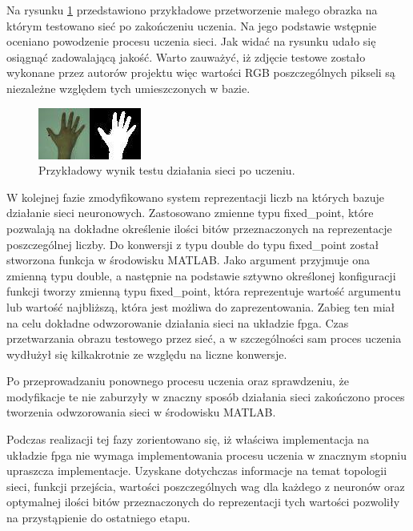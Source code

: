 Na rysunku \ref{fig:reka} przedstawiono przykładowe przetworzenie małego obrazka na którym testowano sieć po zakończeniu uczenia. Na jego podstawie wstępnie oceniano powodzenie procesu uczenia sieci. Jak widać na rysunku udało się osiągnąć zadowalającą jakość. Warto zauważyć, iż zdjęcie testowe zostało wykonane przez autorów projektu więc wartości RGB poszczególnych pikseli są niezależne względem tych umieszczonych w bazie.

\begin{figure}[tbph!]
	\centering
	\includegraphics[width=0.6\linewidth]{images/reka.png}
	\caption{Przykładowy wynik testu działania sieci po uczeniu.}
	\label{fig:reka}
\end{figure}

W kolejnej fazie zmodyfikowano system reprezentacji liczb na których bazuje działanie sieci neuronowych. Zastosowano zmienne typu fixed\_point, które pozwalają na dokładne określenie ilości bitów przeznaczonych na reprezentacje poszczególnej liczby. Do konwersji z typu double do typu fixed\_point został stworzona funkcja w środowisku MATLAB. Jako argument przyjmuje ona zmienną typu double, a następnie na podstawie sztywno określonej konfiguracji funkcji tworzy zmienną typu fixed\_point, która reprezentuje wartość argumentu lub wartość najbliższą, która jest możliwa do zaprezentowania. Zabieg ten miał na celu dokładne odwzorowanie działania sieci na układzie fpga. Czas przetwarzania obrazu testowego przez sieć, a w szczególności sam proces uczenia wydłużył się kilkakrotnie ze względu na liczne konwersje.

Po przeprowadzaniu ponownego procesu uczenia oraz sprawdzeniu, że modyfikacje te nie zaburzyły w znaczny sposób działania sieci zakończono proces tworzenia odwzorowania sieci w środowisku MATLAB. 

Podczas realizacji tej fazy zorientowano się, iż właściwa implementacja na układzie fpga nie wymaga implementowania procesu uczenia w znacznym stopniu upraszcza implementacje. Uzyskane dotychczas informacje na temat topologii sieci, funkcji przejścia, wartości poszczególnych wag dla każdego z neuronów oraz optymalnej ilości bitów przeznaczonych do reprezentacji tych wartości pozwoliły na przystąpienie do ostatniego etapu.

